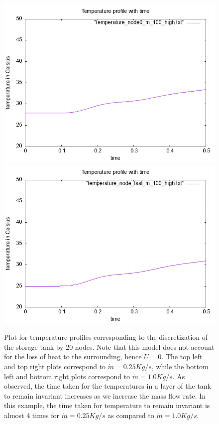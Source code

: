 \documentclass{article}
\begin{document}
\begin{figure}[ht]
\includegraphics[scale =0.4]{temperature_node0_N_20_m_100.png}
\includegraphics[scale =0.4]{temperature_node_last_N_20_m_100.png}
\caption{Plot for temperature profiles corresponding to the discretization of the storage tank by 20 nodes. Note that this model does not account for the loss of heat to the surrounding, hence $U = 0$. The top left and top right plots correspond to $\dot{m} = 0.25 Kg/s$, while the bottom left and bottom right plots correspond to $\dot{m} = 1.0 Kg/s$. As observed, the time taken for the temperatures in a layer of the tank to remain invariant increases as we increase the mass flow rate. In this example, the time taken for temperature to remain invariant is almost 4 times for $\dot{m} = 0.25 Kg/s$ as compared to $\dot{m} = 1.0 Kg/s$.}
\end{figure}
\end{document}
